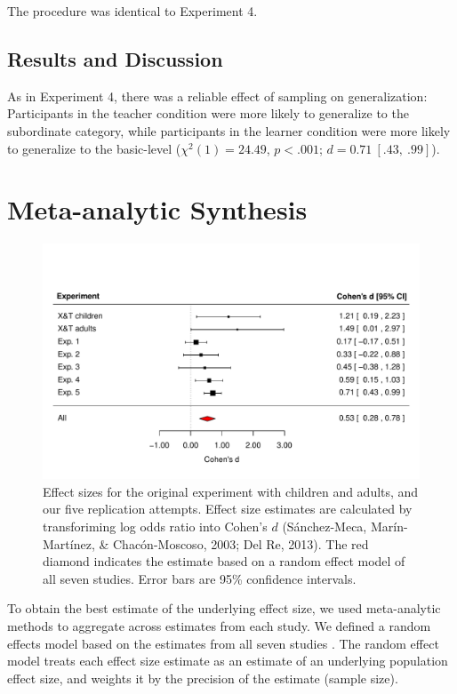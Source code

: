 \documentclass[man]{apa2}
\begin{document}
The procedure was identical to Experiment 4.

\subsection{Results and Discussion}

As in Experiment 4, there was a reliable effect of sampling on generalization: Participants in the teacher condition were more likely to generalize to the subordinate category, while participants in the learner condition were more likely to generalize to the basic-level ($\chi^2(1) = 24.49$, $p <.001$; $d = 0.71\ [.43,\ .99]$).

\section{Meta-analytic Synthesis}

\begin{figure}[t]
  \centering
  \includegraphics[width=6in]{figures/FIG_3.pdf} 
  \caption{\label{fig:effect_sizes} Effect sizes for the original experiment with children and adults, and our five replication attempts. Effect size estimates are calculated  by transforiming log odds ratio into Cohen's $d$ (S\'{a}nchez-Meca, Mar\'{i}n-Mart\'{i}nez, \& Chac\'{o}n-Moscoso, 2003; Del Re, 2013). The red diamond indicates the estimate based on a random effect model of all seven studies. Error bars are 95\% confidence intervals.} 
\end{figure}

To obtain the best estimate of the underlying effect size, we used meta-analytic methods to aggregate across estimates from each study. We defined a random effects model  based on the estimates from all seven studies \cite{Viechtbauer2010}. The random effect model treats each effect size estimate as an estimate of an underlying population effect size, and weights it by the precision of the estimate (sample size). 
\end{document}
